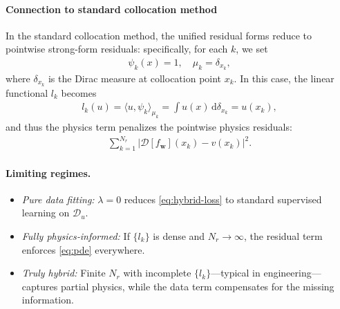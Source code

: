 \documentclass{article}
\theoremstyle{plain}
\theoremstyle{definition}
\theoremstyle{remark}
\begin{document}
\paragraph{Connection to standard collocation method}
In the standard collocation method, the unified residual forms reduce to pointwise strong-form residuals:
specifically, for each $k$, we set
\begin{align*}
\psi_{k}(x)=1,\quad \mu_{k}=\delta_{x_{k}},
\end{align*}
where $\delta_{x_{k}}$ is the Dirac measure at collocation point $x_{k}$.
In this case, the linear functional $l_{k}$ becomes
\begin{align*}
l_{k}(u)=\langle u,\psi_{k}\rangle_{\mu_{k}}=\int u(x)\,\mathrm{d}\delta_{x_{k}}=u(x_{k}),
\end{align*}
and thus the physics term penalizes the pointwise physics residuals:
\begin{align*}
\sum_{k=1}^{N_{r}}\left|\mathscr{D}[f_{\bm w}](x_{k})-v(x_{k})\right|^{2}.
\end{align*}

\paragraph{Limiting regimes.}
\begin{itemize}
\item \emph{Pure data fitting:} $\lambda=0$ reduces \cref{eq:hybrid-loss} to standard supervised learning on $\mathcal{D}_{u}$.
\item \emph{Fully physics‑informed:}  
      If $\{l_{k}\}$ is dense and $N_{r}\to\infty$, the residual term enforces
      \cref{eq:pde} everywhere. 
\item \emph{Truly hybrid:}
      Finite $N_{r}$ with incomplete $\{l_{k}\}$—typical in engineering—captures partial physics,
      while the data term compensates for the missing information.
\end{itemize}
\end{document}
